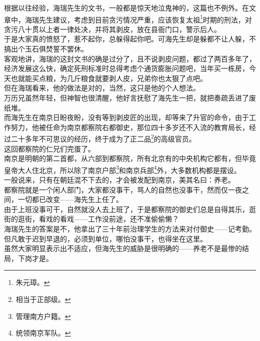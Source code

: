 \begin{multicols}{\theparacolNo}
根据以往经验，海瑞先生的文书，一般都是惊天地泣鬼神的，这篇也不例外。在文章中，海瑞先生建议，考虑到目前贪污情况严重，应该恢复太祖\footnote{朱元璋。}时期的刑法，对贪污八十贯以上者一律处决，并将其剥皮，放在县衙门口，警示后人。\\

于是大家真的愤怒了，惹不起你，总躲得起你吧。可海先生却是躲都不让人躲，不搞出个玉石俱焚誓不罢休。\\

客观地讲，海瑞的这封文书的确是过分了，且不说剥皮问题，都过了两百多年了，经济发展这么快，确定死刑标准时总得考虑个通货膨胀问题吧，当年买一栋房，今天也就能买点粮，为几斤粮食就要剥人皮，兄弟你也太狠了点吧。\\

但在海瑞看来，他的做法是对的，当然，这只是他的个人想法。\\

万历兄虽然年轻，但神智也很清醒，他好言抚慰了海先生一把，就把奏疏丢进了废纸堆。\\

而海先生在南京日盼夜盼，没有等到剥皮匠的出现，却等来了升官的命令，由于工作努力，他被任命为南京都察院右都御史，那位四十多岁还不入流的教育局长，经过二十多年不可思议的经历，终于成为了正二品\footnote{相当于正部级。}的高级官员。\\

这回都察院的仁兄们完蛋了。\\

南京是明朝的第二首都，从六部到都察院，所有北京有的中央机构它都有，但毕竟皇帝大人住北京，所以除了南京户部\footnote{管理南方户籍。}和南京兵部\footnote{统领南京军队。}外，大多数机构都是摆设。\\

一般说来，只有在朝廷混不下去的，才会被发配到南京，美其名曰：养老。\\

都察院就是一个闲人部门，大家都没事干，骂人的自然也没事干，然而仅一夜之间，一切都已改变——海先生上任了。\\

由于上班没事可干，自然就没人去上班了，于是都察院的御史们总是自得其乐，逛街的逛街，看戏的看戏——工作没前途，还不准偷偷懒？\\

海瑞先生的答案是不，他拿出了三十年前治理学生的方法来对付御史——记考勤。但凡敢于迟到早退的，必须到单位，哪怕没事干，也得坐在这里。\\

虽然大家明显表示出不适应，但海先生的威胁是很明确的——养老不是最惨的结局，下岗才是。\\


\end{multicols}
